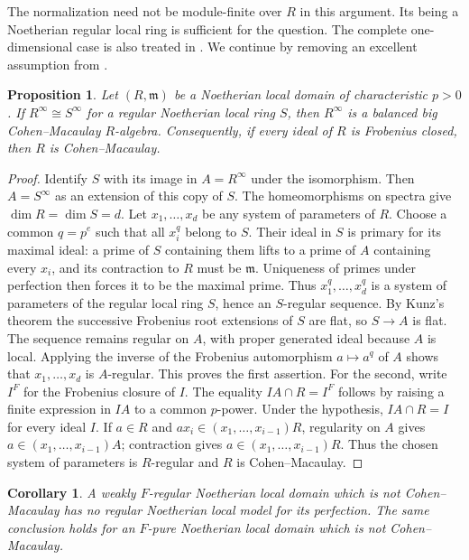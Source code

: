 \documentclass[11pt,a4paper]{amsart}
\numberwithin{equation}{section}
\newtheorem{proposition}[theorem]{Proposition}
\newtheorem{corollary}[theorem]{Corollary}
\newcommand{\m}{\mathfrak m}
\begin{document}
 The normalization need not be module-finite over $R$ in this argument.
 Its being a Noetherian regular local ring is sufficient for the
 question. The complete one-dimensional case is also treated in
 \cite[Corollary~3.14]{moh}.
 We continue by removing an excellent assumption from \cite{Shim}.
 \begin{proposition}\label{prop:bcm}	Let $(R,\m)$ be a Noetherian local domain of characteristic $p>0$. 	If $R^\infty\cong S^\infty$ for a regular Noetherian local ring $S$, then	$R^\infty$ is a balanced big Cohen--Macaulay $R$-algebra. Consequently,	if every ideal of $R$ is Frobenius closed, then $R$ is Cohen--Macaulay.
 \end{proposition}
 
 \begin{proof}	Identify $S$ with its image in $A=R^\infty$ under the isomorphism.	Then $A=S^\infty$ as an extension of this copy of $S$.	The homeomorphisms on spectra give	$\dim R=\dim S=d$.	Let $x_1,\ldots,x_d$ be any system of parameters of $R$.	Choose a common $q=p^e$ such that all $x_i^q$ belong to $S$.	Their ideal in $S$ is primary for its maximal ideal: a prime of $S$	containing them lifts to a prime of $A$ containing every $x_i$, and	its contraction to $R$ must be $\m$. Uniqueness of primes under	perfection then forces it to be the maximal prime.
 Thus $x_1^q,\ldots,x_d^q$ is a system of parameters of the regular	local ring $S$, hence an $S$-regular sequence. By Kunz's theorem the 	successive Frobenius root extensions of $S$ are flat, so $S\to A$	is flat. The sequence remains regular on $A$, with proper generated 	ideal because $A$ is local. Applying the inverse of the Frobenius 	automorphism $a\mapsto a^q$ of $A$ shows that	$x_1,\ldots,x_d$ is $A$-regular. This proves the first assertion.	For the second, write $I^F$ for the Frobenius closure of $I$.	The equality
 $IA\cap R=I^F$	follows by raising a finite expression in $IA$ to a common	$p$-power. Under the hypothesis, $IA\cap R=I$ for every ideal $I$.	If $a\in R$ and	$ax_i\in (x_1,\ldots,x_{i-1})R$, regularity on $A$ gives	$a\in(x_1,\ldots,x_{i-1})A$; contraction gives	$a\in(x_1,\ldots,x_{i-1})R$.	Thus the chosen system of parameters is $R$-regular and $R$ is	Cohen--Macaulay.
 \end{proof}
 
 \begin{corollary}\label{cor:weak}	A weakly $F$-regular Noetherian local domain which is not	Cohen--Macaulay has no regular Noetherian local model for its	perfection. The same conclusion holds for an $F$-pure	Noetherian local domain which is not Cohen--Macaulay.
 \end{corollary}
 
\end{document}
